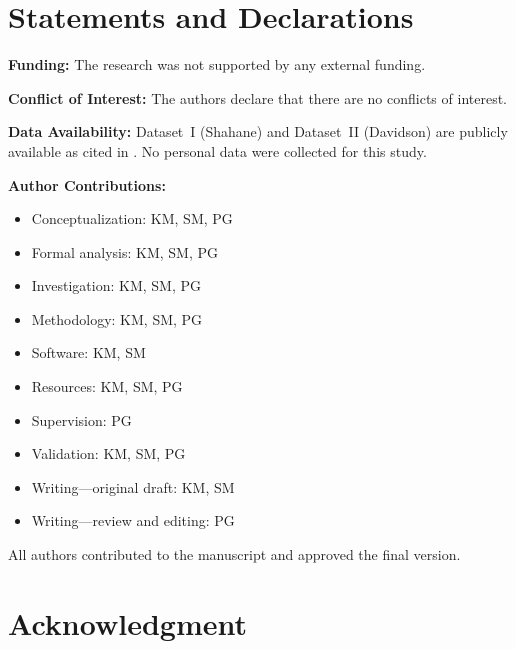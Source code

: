 \section*{Statements and Declarations}





\textbf{Funding:} The research was not supported by any external funding.

\textbf{Conflict of Interest:} The authors declare that there are no conflicts of interest.

\textbf{Data Availability:} Dataset~I (Shahane) and Dataset~II (Davidson) are publicly available as cited in \cite{ref10,ref11}. No personal data were collected for this study.

\textbf{Author Contributions:}
\begin{itemize}
    \item Conceptualization: KM, SM, PG
    \item Formal analysis: KM, SM, PG
    \item Investigation: KM, SM, PG
    \item Methodology: KM, SM, PG
    \item Software: KM, SM
    \item Resources: KM, SM, PG
    \item Supervision: PG
    \item Validation: KM, SM, PG
    \item Writing---original draft: KM, SM
    \item Writing---review and editing: PG
\end{itemize}

All authors contributed to the manuscript and approved the final version.

\section*{Acknowledgment}
